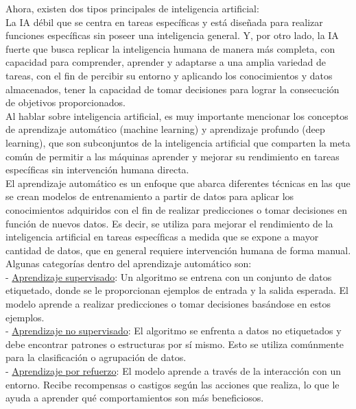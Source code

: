 Ahora, existen dos tipos principales de inteligencia artificial:\\
La IA débil que se centra en tareas específicas y está diseñada para realizar funciones específicas sin poseer una inteligencia general. Y, por otro lado, la IA fuerte que busca replicar la inteligencia humana de manera más completa, con capacidad para comprender, aprender y adaptarse a una amplia variedad de tareas, con el fin de percibir su entorno y aplicando los conocimientos y datos almacenados, tener la capacidad de tomar decisiones para lograr la consecución de objetivos proporcionados.\\

Al hablar sobre inteligencia artificial, es muy importante mencionar los conceptos de aprendizaje automático (machine learning) y aprendizaje profundo (deep learning), que son subconjuntos de la inteligencia artificial que comparten la meta común de permitir a las máquinas aprender y mejorar su rendimiento en tareas específicas sin intervención humana directa.\\
El aprendizaje automático es un enfoque que abarca diferentes técnicas en las que se crean modelos de entrenamiento a partir de datos para aplicar los conocimientos adquiridos con el fin de realizar predicciones o tomar decisiones en función de nuevos datos. Es decir, se utiliza para mejorar el rendimiento de la inteligencia artificial en tareas específicas a medida que se expone a mayor cantidad de datos, que en general requiere intervención humana de forma manual.\\

Algunas categorías dentro del aprendizaje automático son:\\
- \underline{ Aprendizaje supervisado}: Un algoritmo se entrena con un conjunto de datos etiquetado, donde se le proporcionan ejemplos de entrada y la salida esperada. El modelo aprende a realizar predicciones o tomar decisiones basándose en estos ejemplos.\\

- \underline{ Aprendizaje no supervisado}: El algoritmo se enfrenta a datos no etiquetados y debe encontrar patrones o estructuras por sí mismo. Esto se utiliza comúnmente para la clasificación o agrupación de datos.\\

- \underline{ Aprendizaje por refuerzo}: El modelo aprende a través de la interacción con un entorno. Recibe recompensas o castigos según las acciones que realiza, lo que le ayuda a aprender qué comportamientos son más beneficiosos.\\

